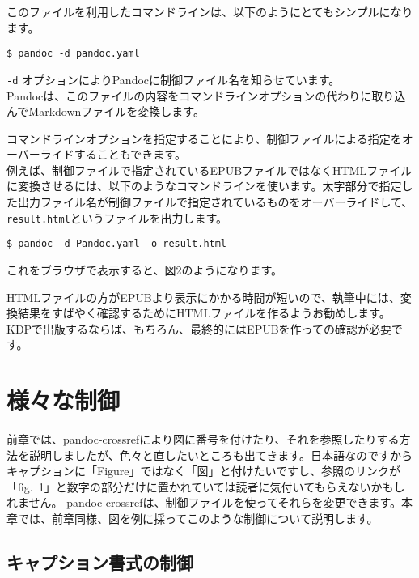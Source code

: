 このファイルを利用したコマンドラインは、以下のようにとてもシンプルになります。

\begin{verbatim}
$ pandoc -d pandoc.yaml
\end{verbatim}

\texttt{-d} オプションによりPandocに制御ファイル名を知らせています。\\
Pandocは、このファイルの内容をコマンドラインオプションの代わりに取り込んでMarkdownファイルを変換します。

コマンドラインオプションを指定することにより、制御ファイルによる指定をオーバーライドすることもできます。\\
例えば、制御ファイルで指定されているEPUBファイルではなくHTMLファイルに変換させるには、以下のようなコマンドラインを使います。太字部分で指定した出力ファイル名が制御ファイルで指定されているものをオーバーライドして、\texttt{result.html}というファイルを出力します。

\begin{verbatim}
$ pandoc -d Pandoc.yaml -o result.html
\end{verbatim}

これをブラウザで表示すると、図2のようになります。

HTMLファイルの方がEPUBより表示にかかる時間が短いので、執筆中には、変換結果をすばやく確認するためにHTMLファイルを作るようお勧めします。\\
KDPで出版するならば、もちろん、最終的にはEPUBを作っての確認が必要です。

\chapter{様々な制御}\label{ux69d8ux3005ux306aux5236ux5fa1}

前章では、pandoc-crossrefにより図に番号を付けたり、それを参照したりする方法を説明しましたが、色々と直したいところも出てきます。日本語なのですからキャプションに「Figure」ではなく「図」と付けたいですし、参照のリンクが「fig.~1」と数字の部分だけに置かれていては読者に気付いてもらえないかもしれません。
pandoc-crossrefは、制御ファイルを使ってそれらを変更できます。本章では、前章同様、図を例に採ってこのような制御について説明します。

\section{キャプション書式の制御}\label{ux30adux30e3ux30d7ux30b7ux30e7ux30f3ux66f8ux5f0fux306eux5236ux5fa1}

